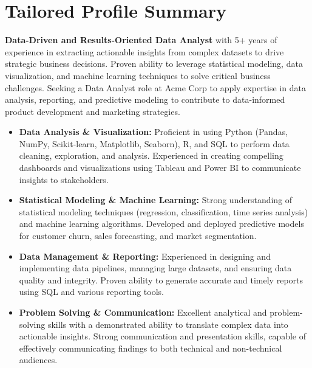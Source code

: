 \documentclass{article}
\begin{document}
\section*{Tailored Profile Summary}

\RaggedRight %

\textbf{Data-Driven and Results-Oriented Data Analyst} with 5+ years of experience in extracting actionable insights from complex datasets to drive strategic business decisions. Proven ability to leverage statistical modeling, data visualization, and machine learning techniques to solve critical business challenges. Seeking a Data Analyst role at Acme Corp to apply expertise in data analysis, reporting, and predictive modeling to contribute to data-informed product development and marketing strategies.

\begin{itemize}[label=$\blacksquare$, leftmargin=*]
    \item \textbf{Data Analysis \& Visualization:} Proficient in using Python (Pandas, NumPy, Scikit-learn, Matplotlib, Seaborn), R, and SQL to perform data cleaning, exploration, and analysis. Experienced in creating compelling dashboards and visualizations using Tableau and Power BI to communicate insights to stakeholders.
    \item \textbf{Statistical Modeling \& Machine Learning:}  Strong understanding of statistical modeling techniques (regression, classification, time series analysis) and machine learning algorithms. Developed and deployed predictive models for customer churn, sales forecasting, and market segmentation.
    \item \textbf{Data Management \& Reporting:} Experienced in designing and implementing data pipelines, managing large datasets, and ensuring data quality and integrity. Proven ability to generate accurate and timely reports using SQL and various reporting tools.
    \item \textbf{Problem Solving \& Communication:}  Excellent analytical and problem-solving skills with a demonstrated ability to translate complex data into actionable insights. Strong communication and presentation skills, capable of effectively communicating findings to both technical and non-technical audiences.
\end{itemize}
\end{document}
